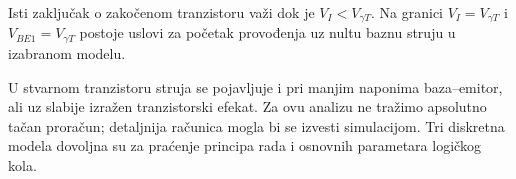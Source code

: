 Isti zaključak o zakočenom tranzistoru važi dok je $V_I<V_{\gamma T}$. Na granici $V_I=V_{\gamma T}$ i $V_{BE1}=V_{\gamma T}$ postoje uslovi za početak provođenja uz nultu baznu struju u izabranom modelu.

U stvarnom tranzistoru struja se pojavljuje i pri manjim naponima baza–emitor, ali uz slabije izražen tranzistorski efekat. Za ovu analizu ne tražimo apsolutno tačan proračun; detaljnija računica mogla bi se izvesti simulacijom. Tri diskretna modela dovoljna su za praćenje principa rada i osnovnih parametara logičkog kola.
